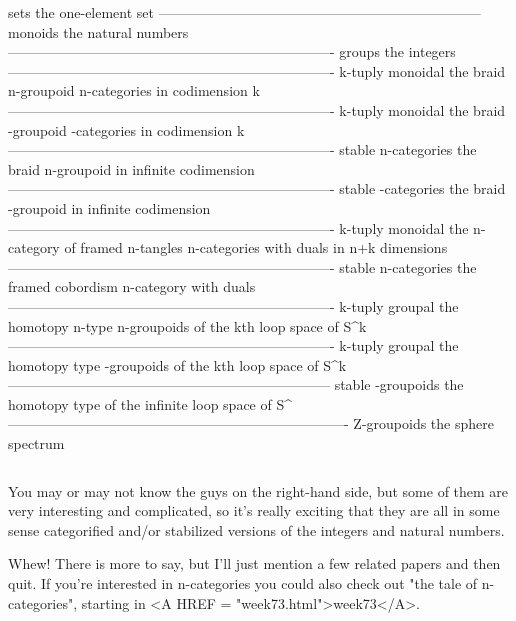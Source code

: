     sets                               the one-element set
---------------------------------------------------------------------
   monoids                             the natural numbers
----------------------------------------------------------------------
    groups                                the integers
----------------------------------------------------------------------
 k-tuply monoidal                      the braid n-groupoid 
   n-categories                           in codimension k
----------------------------------------------------------------------
  k-tuply monoidal                    the braid \omega -groupoid 
  \omega -categories                        in codimension k
----------------------------------------------------------------------
 stable n-categories                  the braid n-groupoid 
                                     in infinite codimension
----------------------------------------------------------------------
stable \omega -categories               the braid \omega -groupoid 
                                      in infinite codimension
----------------------------------------------------------------------
  k-tuply monoidal                 the n-category of framed n-tangles
n-categories with duals                  in n+k dimensions
----------------------------------------------------------------------
 stable n-categories                the framed cobordism n-category
    with duals
----------------------------------------------------------------------
 k-tuply groupal                         the homotopy n-type 
  n-groupoids                        of the kth loop space of S^{k}
----------------------------------------------------------------------
 k-tuply groupal                          the homotopy type  
 \omega -groupoids                    of the kth loop space of S^{k}
---------------------------------------------------------------------
stable \omega -groupoids                   the homotopy type 
                                   of the infinite loop space of S^{\infty }
-------------------------------------------------------------------------
   Z-groupoids                          the sphere spectrum       

$$
    
You may or may not know the guys on the right-hand side, but some of
them are very interesting and complicated, so it's really exciting that
they are all in some sense categorified and/or stabilized versions of 
the integers and natural numbers.  

Whew!  There is more to say, but I'll just mention a few related
papers and then quit.  If you're interested in n-categories you
could also check out "the tale of n-categories", starting in 
<A HREF = "week73.html">week73</A>.

